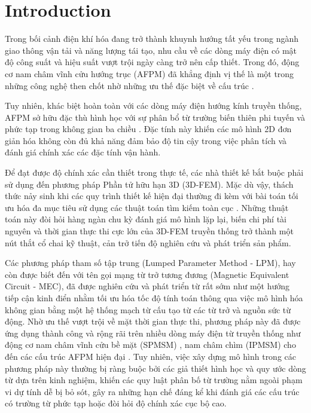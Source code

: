 \section{Introduction}
Trong bối cảnh điện khí hóa đang trở thành khuynh hướng tất yếu trong ngành giao thông vận tải và năng lượng tái tạo, nhu cầu về các dòng máy điện có mật độ công suất và hiệu suất vượt trội ngày càng trở nên cấp thiết. Trong đó, động cơ nam châm vĩnh cửu hướng trục (AFPM) đã khẳng định vị thế là một trong những công nghệ then chốt nhờ những ưu thế đặc biệt về cấu trúc \cite{jenkins2023innovations,gieras2008axial,capponi2012recent,xu2021comparative}. 

Tuy nhiên, khác biệt hoàn toàn với các dòng máy điện hướng kính truyền thống, AFPM sở hữu đặc thù hình học với sự phân bổ từ trường biến thiên phi tuyến và phức tạp trong không gian ba chiều \cite{vatani2025axial,ni2013investigation}. Đặc tính này khiến các mô hình 2D đơn giản hóa không còn đủ khả năng đảm bảo độ tin cậy trong việc phân tích và đánh giá chính xác các đặc tính vận hành. 

Để đạt được độ chính xác cần thiết trong thực tế, các nhà thiết kế bắt buộc phải sử dụng đến phương pháp Phần tử hữu hạn 3D (3D-FEM). Mặc dù vậy, thách thức nảy sinh khi các quy trình thiết kế hiện đại thường đi kèm với bài toán tối ưu hóa đa mục tiêu sử dụng các thuật toán tìm kiếm toàn cục \cite{huner2023design,subotic2019weight,liu2025optimization}. Những thuật toán này đòi hỏi hàng ngàn chu kỳ đánh giá mô hình lặp lại, biến chi phí tài nguyên và thời gian thực thi cực lớn của 3D-FEM truyền thống trở thành một nút thắt cổ chai kỹ thuật, cản trở tiến độ nghiên cứu và phát triển sản phẩm.

Các phương pháp tham số tập trung (Lumped Parameter Method - LPM), hay còn được biết đến với tên gọi mạng từ trở tương đương (Magnetic Equivalent Circuit - MEC), đã được nghiên cứu và phát triển từ rất sớm như một hướng tiếp cận kinh điển nhằm tối ưu hóa tốc độ tính toán thông qua việc mô hình hóa không gian bằng một hệ thống mạch từ cấu tạo từ các từ trở và nguồn sức từ động. Nhờ ưu thế vượt trội về mặt thời gian thực thi, phương pháp này đã được ứng dụng thành công và rộng rãi trên nhiều dòng máy điện từ truyền thống như động cơ nam châm vĩnh cửu bề mặt (SPMSM) \cite{manju2018magnetic,cui2025equivalent,zhang2019equivalent,yang2011surface}, nam châm chìm (IPMSM) \cite{kemmetmuller2014modeling,zhu2009analytical,tariq2010iron} cho đến các cấu trúc AFPM hiện đại \cite{zhang20213,6971543,6600909,7869440}. Tuy nhiên, việc xây dựng mô hình trong các phương pháp này thường bị ràng buộc bởi các giả thiết hình học và quy ước dòng từ dựa trên kinh nghiệm, khiến các quy luật phân bố từ trường nằm ngoài phạm vi dự tính dễ bị bỏ sót, gây ra những hạn chế đáng kể khi đánh giá các cấu trúc có trường từ phức tạp hoặc đòi hỏi độ chính xác cục bộ cao.

